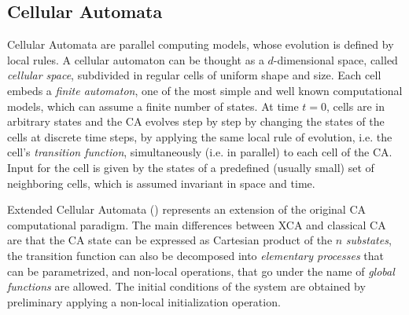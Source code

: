 \subsection{Cellular Automata}\label{sec:CA}
    Cellular Automata \cite{Neumann1966} are parallel computing models, whose evolution
    is defined by local rules. A cellular automaton can be thought as
    a $d$-dimensional space, called \emph{cellular space}, subdivided
    in regular cells of uniform shape and size. Each cell embeds a
    \emph{finite automaton}, one of the most simple and well known
    computational models, which can assume a finite number of
    states. At time $t=0$, cells are in arbitrary states and the CA
    evolves step by step by changing the states of the cells at
    discrete time steps, by applying the same local rule of evolution,
    i.e. the cell's \emph{transition function}, simultaneously
    (i.e. in parallel) to each cell of the CA. Input for the cell is
    given by the states of a predefined (usually small) set of
    neighboring cells, which is assumed invariant in space and time.
 
 Extended Cellular Automata (\cite{toti1999, spataro2014})  represents an extension of the original CA computational paradigm.   
    The main differences between XCA and classical CA are that the CA state can be expressed as Cartesian product of the $n$ 
    \emph{substates}, the transition function can also be decomposed into \textit{elementary processes} that can be parametrized,
    and non-local operations, that go under the name of \textit{global functions} are allowed. The initial conditions of the system are obtained by preliminary applying a non-local initialization operation.
    



